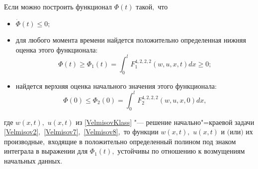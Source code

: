 \smallskip

\hypertarget{Velm:lemma1}{}

\begin{lemma}[1]Если можно построить функционал $\Phi (t)$ такой$,$ что
\begin{itemize}
\item[а\/\rm)] $\dot{\Phi }(t)\le 0;$

\item[б\/\rm)]
для любого момента времени найдется положительно определенная нижняя оценка этого функционала\/{\rm:}
\begin{equation} 
\label{Velmisov9} 
\Phi (t)\ge \Phi _{1} (t)=\int _{0}^{l}F_{1}^{4,2,2,2} (w,u,x,t)dx\ge 0 ; 
\end{equation} 

\item[в\/\rm)]
найдется верхняя оценка начального значения этого функционала\/{\rm:}
\begin{equation} 
\label{Velmisov10} 
\Phi (0)\le \Phi _{2} (0)=\int _{0}^{l}F_{2}^{4,2,2,2} (w,u,x,0)dx , 
\end{equation} 

\end{itemize}
где $w(x,t),$  $u(x,t)$ из \eqref{VelmisovKlass} "--- решение начально"=краевой задачи \eqref{Velmisov2}$,$ \eqref{Velmisov7}$,$ \eqref{Velmisov8}$,$ 
то функции $w(x,t),$ $u(x,t)$ и $($или$)$ их производные$,$ входящие в положительно определенный полином под знаком интеграла в выражении для $\Phi_1(t),$ устойчивы по отношению к возмущениям начальных данных$.$


\end{lemma}

\smallskip

